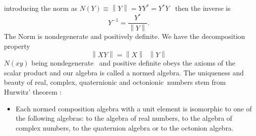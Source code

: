 \documentclass[a4paper,12pt]{book}
\begin{document}
introducing the norm as $N\left( Y\right) \equiv \left\| Y\right\|
=YY^{*}=Y^{*}Y$ \ then the inverse is 
\begin{equation}
Y^{-1}=\frac{Y^{*}}{\left\| Y\right\| }.
\end{equation}
The Norm is nondegenerate and positively definite. We have the decomposition
property 
\begin{equation}
\left\| XY\right\| =\left\| X\right\| \;\;\left\| Y\right\|  \label{dec}
\end{equation}
$N\left( xy\right) $ being nondegenerate \ and positive definite obeys the
axioms of the scalar product and our algebra is called a normed algebra. The
uniqueness and beauty of real, complex, quaternionic and octonionic\ numbers
stem from Hurwitz' theorem \cite{hur}:

\begin{itemize}
\item[ ]  Each normed composition algebra with a unit element is isomorphic
to one of the following algebras: to the algebra of real numbers, to the
algebra of complex numbers, to the quaternion algebra or to the octonion
algebra.
\end{itemize}
\end{document}
